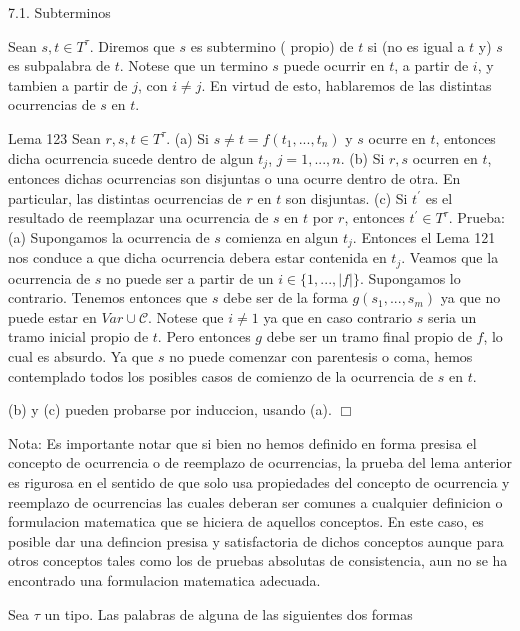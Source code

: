 7.1. Subterminos

Sean \(s,t\in T^{\tau }\). Diremos que \(s\) es subtermino ( propio) de \(t\) si (no es igual a \(t\) y) \(s\) es subpalabra de \(t\). Notese que un termino \(s\) puede ocurrir en \(t\), a partir de \(i\), y tambien a partir de \(j\), con \(i\neq j\). En virtud de esto, hablaremos de las distintas ocurrencias de \(s\) en \(t\).

Lema 123 Sean \(r,s,t\in T^{\tau }\).
(a) Si \(s\neq t=f(t_{1},...,t_{n})\) y \(s\) ocurre en \(t\), entonces dicha ocurrencia sucede dentro de algun \(t_{j}\), \(j=1,...,n\).
(b) Si \(r,s\) ocurren en \(t\), entonces dichas ocurrencias son disjuntas o una ocurre dentro de otra. En particular, las distintas ocurrencias de \(r\) en \(t\) son disjuntas.
(c) Si \(t^{\prime }\) es el resultado de reemplazar una ocurrencia de \(s\) en \(t\) por \(r\), entonces \(t^{\prime }\in T^{\tau }\).
Prueba: (a) Supongamos la ocurrencia de \(s\) comienza en algun \(t_{j}\). Entonces el Lema 121 nos conduce a que dicha ocurrencia debera estar contenida en \(t_{j}\). Veamos que la ocurrencia de \(s\) no puede ser a partir de un \(i\in \{1,...,\left\vert f\right\vert \}\). Supongamos lo contrario. Tenemos entonces que \(s\) debe ser de la forma \(g(s_{1},...,s_{m})\) ya que no puede estar en \(Var\cup \mathcal{C}\). Notese que \(i\neq 1\) ya que en caso contrario \(s\) seria un tramo inicial propio de \(t\). Pero entonces \(g\) debe ser un tramo final propio de \(f\), lo cual es absurdo. Ya que \(s\) no puede comenzar con parentesis o coma, hemos contemplado todos los posibles casos de comienzo de la ocurrencia de \(s\) en \(t\).

(b) y (c) pueden probarse por induccion, usando (a). \(\Box\)



Nota: Es importante notar que si bien no hemos definido en forma presisa el concepto de ocurrencia o de reemplazo de ocurrencias, la prueba del lema anterior es rigurosa en el sentido de que solo usa propiedades del concepto de ocurrencia y reemplazo de ocurrencias las cuales deberan ser comunes a cualquier definicion o formulacion matematica que se hiciera de aquellos conceptos. En este caso, es posible dar una defincion presisa y satisfactoria de dichos conceptos aunque para otros conceptos tales como los de pruebas absolutas de consistencia, aun no se ha encontrado una formulacion matematica adecuada.

Sea \(\tau \) un tipo. Las palabras de alguna de las siguientes dos formas


